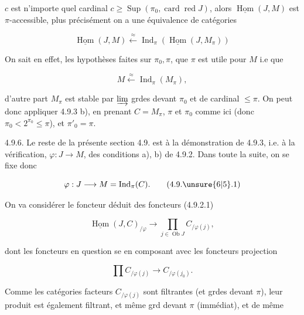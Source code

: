 
 $c$ est n'importe quel cardinal $c\geq\operatorname{Sup}(\pi_0,\operatorname{card}\operatorname{red}J)$, alors $\underline{\operatorname{Hom}}(J,M)$ est $\pi$-accessible, plus précisément on a une équivalence de catégories

\[
\underline{\operatorname{Hom}}(J,M)\xleftarrow{\approx}\operatorname{Ind}_{\pi}(\underline{\operatorname{Hom}}(J,M_{\pi}))\tag*{(4.9.5.1)}
\]

On sait en effet,  les hypothèses faites sur $\pi_0,\pi$, que  $\pi$ est utile pour $M$ i.e que

\[
M\xleftarrow{\approx}\operatorname{Ind}_{\pi}(M_{\pi}),
\]

d'autre part $M_\pi$ est stable par $\varinjlim$ grdes devant $\pi_0$ et de cardinal $\leq\pi$. On peut donc appliquer 4.9.3 b), en prenant $C=M_{\pi}$, $\pi$ et $\pi_0$ comme ici (donc $\pi_0<2^{\pi_0}\leq\pi$), et $\pi'_0=\pi$.


4.9.6. Le reste de la présente section 4.9. est  à la démonstration de 4.9.3, i.e. à la vérification,  $\varphi:J\longrightarrow M$, des conditions a), b) de 4.9.2. Dans toute la suite, on se fixe donc 

\[
\varphi:J\longrightarrow M=\operatorname{Ind}_{\pi}(C).\tag*{(4.9.\unsure{6|5}.1)}
\]


On va considérer le foncteur déduit des foncteurs (4.9.2.1)

\[
\underline{\operatorname{Hom}}(J,C)_{/\varphi}\longrightarrow\prod_{j\in\operatorname{Ob}J} C_{/\varphi(j)},\tag*{(4.9.6.2)}
\]

dont les foncteurs en question se  en composant avec les foncteurs projection

\[
\prod C_{/\varphi(j)}\longrightarrow C_{/\varphi(j_0)}.\tag*{(4.9.6.3)}
\]

Comme les catégories facteurs $C_{/\varphi(j)}$ sont filtrantes (et  grdes devant $\pi$), leur produit est également filtrant, et même grd devant $\pi$ (immédiat), et de même

